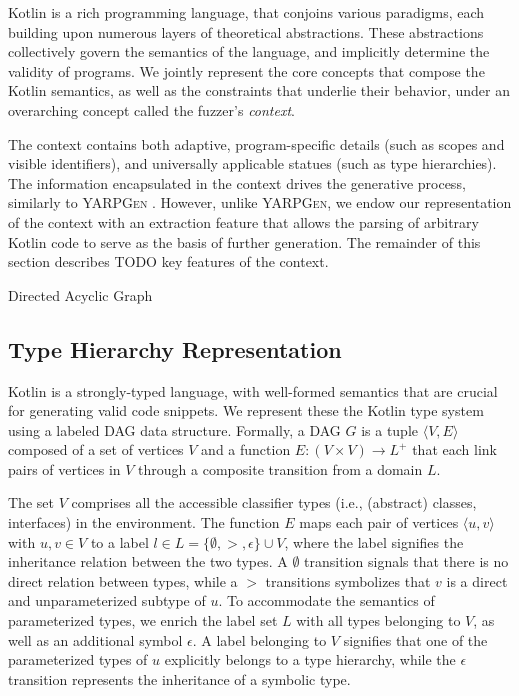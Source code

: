 Kotlin is a rich programming language, that conjoins various
paradigms, each building upon numerous layers of
theoretical abstractions.
These abstractions collectively govern the semantics
of the language, and implicitly determine the validity of programs.
We jointly represent the core concepts that compose the Kotlin
semantics, as well as the constraints that underlie their behavior,
under an overarching concept called the fuzzer's \textit{context}.

The context contains both adaptive, program-specific details (such as scopes and
visible identifiers), and universally applicable statues (such as type hierarchies).
The information encapsulated in the context drives the generative
process, similarly to \textsc{YARPGen} \cite{manes2019art}.
However, unlike \textsc{YARPGen}, we endow our representation of the context
with an extraction feature that allows the parsing of arbitrary
Kotlin code to serve as the basis of further generation. 
The remainder of this section describes TODO key features of the context.

 {Directed Acyclic Graph}

\subsection{\label{subsec:type-hierarchy}Type Hierarchy Representation}

Kotlin is a strongly-typed language, with well-formed semantics
that are crucial for generating valid code snippets.
We represent these the Kotlin type system using a labeled \Gls{DAG} data structure.
Formally, a \Gls{DAG} $G$ is a tuple $\langle V, E \rangle$ composed
of a set of vertices $V$ and a function $E : (V \times V) \to L^{+}$ that
each link pairs of vertices in $V$ through a composite transition from a domain $L$.

The set $V$ comprises all the accessible classifier types
(i.e., (abstract) classes, interfaces) in the environment.
The function $E$ maps each pair of vertices $\langle u, v \rangle$ with $u, v \in V$
to a label $l \in L = \{ \emptyset, >, \epsilon \} \cup V$, where the label signifies
the inheritance relation between the two types.
A $\emptyset$ transition signals that there is no direct relation between types, while
a $>$ transitions symbolizes that $v$ is a direct and unparameterized subtype of $u$.
To accommodate the semantics of parameterized types, we enrich the label set $L$
with all types belonging to $V$, as well as an additional symbol $\epsilon$.
A label belonging to $V$ signifies that one of the parameterized types of $u$
explicitly belongs to a type hierarchy, while the $\epsilon$ transition represents
the inheritance of a symbolic type.

